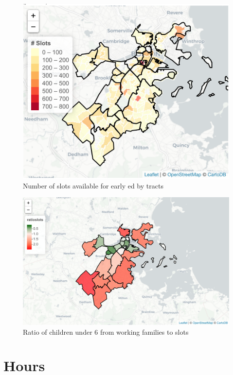 \documentclass[10pt,letterpaper]{article}
\begin{document}
\begin{figure}

{\centering \includegraphics[width=0.8\linewidth]{fig2_capacitytractsupply} 

}

\caption{Number of slots available for early ed by tracts}\label{fig:unnamed-chunk-3}
\end{figure}

\begin{figure}

{\centering \includegraphics[width=1\linewidth]{fig3} 

}

\caption{Ratio of children under 6 from working families to slots}\label{fig:unnamed-chunk-4}
\end{figure}

\section{Hours}\label{hours}
\end{document}
